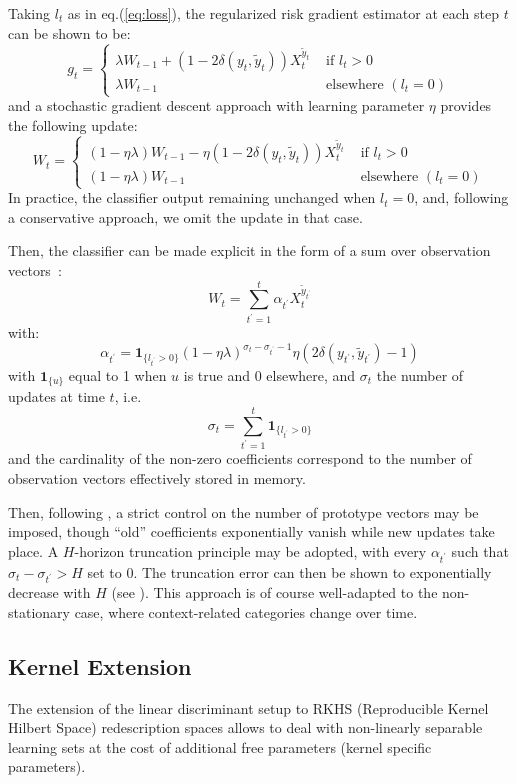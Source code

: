 \documentclass[preprint,12pt,authoryear]{elsarticle}
\begin{document}
Taking $l_t$ as in eq.(\ref{eq:loss}), the regularized risk gradient estimator at each step $t$ can be shown to be:
$$g_t = \left\{
\begin{array}{ll}
\lambda W_{t-1} + (1 - 2 \delta(y_t,\tilde{y}_t)) X_t^{\tilde{y}_t} &\text{ if } l_t > 0\\
\lambda W_{t-1} &\text{ elsewhere }(l_t=0)
\end{array}
\right.$$
and a stochastic gradient descent approach with learning parameter $\eta$ provides the following update:
$$W_t =  \left\{
\begin{array}{ll}
(1-\eta\lambda) W_{t-1} - \eta (1 - 2 \delta(y_t,\tilde{y}_t)) X_t^{\tilde{y}_t} &\text{ if } l_t > 0\\
(1-\eta\lambda) W_{t-1} &\text{ elsewhere }(l_t = 0)
\end{array}
\right.$$
In practice, the classifier output remaining unchanged when $l_t = 0$, and, following a conservative approach, we omit the update in that case. 

Then, the classifier can be made explicit in the form of a sum over observation vectors~:
$$W_t = \sum_{t^\prime=1}^t \alpha_{t^\prime} X_t^{\tilde{y}_{t^\prime}}$$
with:
$$\alpha_{t^\prime} = \mathbf{1}_{\{l_{t^\prime} > 0\}}(1 - \eta \lambda)^{\sigma_t - \sigma_{t^\prime}-1}  \eta (2\delta(y_{t^\prime},\tilde{y}_{t^\prime})-1)$$
with $\mathbf{1}_{\{u\}}$ equal to 1 when $u$ is true and 0 elsewhere, and $\sigma_t$  the number of updates at time $t$, i.e.
$$\sigma_t = \sum_{t^\prime=1}^t \mathbf{1}_{\{l_{t^\prime} > 0\}}$$  
and the cardinality of the non-zero coefficients correspond to the number of observation vectors effectively stored in memory.

Then, following \cite{kivinen2004online}, a strict control on the number of prototype vectors may be imposed, though ``old'' coefficients exponentially vanish while new updates take place. A $H$-horizon truncation principle may be adopted, with every $\alpha_{t^\prime}$ such that $\sigma_t - \sigma_{t^\prime} > H$ set to 0. The truncation error can then be shown to  exponentially decrease with $H$ (see \cite{kivinen2004online}). This approach is of course well-adapted to the non-stationary case, where context-related categories change over time.




\subsection{Kernel Extension}
The extension of the linear discriminant setup to 
RKHS (Reproducible Kernel Hilbert Space) redescription spaces 
allows to deal with non-linearly separable learning sets at the cost of additional free parameters (kernel specific parameters). 
\end{document}
